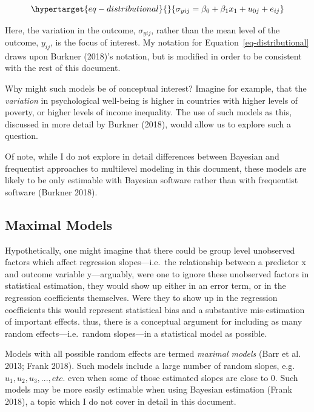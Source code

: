 \documentclass[
  letterpaper,
  DIV=11,
  numbers=noendperiod]{scrreprt}
\begin{document}
\begin{equation}\protect\hypertarget{eq-distributional}{}{\sigma_{yij} = \beta_0 + \beta_1 x_1 + u_{0j} + e_{ij}}\label{eq-distributional}\end{equation}

Here, the variation in the outcome, \(\sigma_{yij}\), rather than the
mean level of the outcome, \(y_{ij}\), is the focus of interest. My
notation for Equation~\ref{eq-distributional} draws upon Burkner
(2018)'s notation, but is modified in order to be consistent with the
rest of this document.

Why might such models be of conceptual interest? Imagine for example,
that the \emph{variation} in psychological well-being is higher in
countries with higher levels of poverty, or higher levels of income
inequality. The use of such models as this, discussed in more detail by
Burkner (2018), would allow us to explore such a question.

Of note, while I do not explore in detail differences between Bayesian
and frequentist approaches to multilevel modeling in this document,
these models are likely to be only estimable with Bayesian software
rather than with frequentist software (Burkner 2018).

\hypertarget{maximal-models}{%
\subsection{Maximal Models}\label{maximal-models}}

Hypothetically, one might imagine that there could be group level
unobserved factors which affect regression slopes---i.e.~the
relationship between a predictor x and outcome variable y---arguably,
were one to ignore these unobserved factors in statistical estimation,
they would show up either in an error term, or in the regression
coefficients themselves. Were they to show up in the regression
coefficients this would represent statistical bias and a substantive
mis-estimation of important effects. thus, there is a conceptual
argument for including as many random effects---i.e.~random slopes---in
a statistical model as possible.

Models with all possible random effects are termed \emph{maximal models}
(Barr et al. 2013; Frank 2018). Such models include a large number of
random slopes, e.g.~\(u_1, u_2, u_3, ..., etc.\) even when some of those
estimated slopes are close to 0. Such models may be more easily
estimable when using Bayesian estimation (Frank 2018), a topic which I
do not cover in detail in this document.
\end{document}
